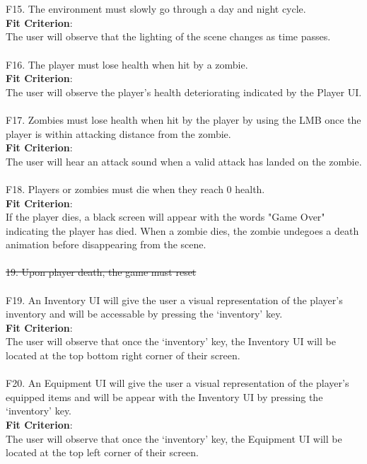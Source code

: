 \documentclass[12pt, titlepage]{article}
\begin{document}
\\\\
{\color{magenta} F15.} The environment must slowly go through a day and night cycle. \\
{\color{magenta} \textbf{Fit Criterion}:\\ The user will observe that the lighting of the scene changes as time passes. }
\\\\
{\color{magenta} F16.} The player must lose health when hit by a zombie. \\
{\color{magenta} \textbf{Fit Criterion}:\\ The user will observe the player's health deteriorating indicated by the Player UI.} 
\\\\
{\color{magenta} F17.} Zombies must lose health when hit by the player {\color{magenta} by using the LMB once the player is within attacking distance from the zombie. \\
\textbf{Fit Criterion}:\\ The user will hear an attack sound when a valid attack has landed on the zombie}. 
\\\\
{\color{magenta} F18.} Players or zombies must die when they reach 0 health. \\
{\color{magenta} \textbf{Fit Criterion}:\\ If the player dies, a black screen will appear with the words "Game Over" indicating the player has died. When a zombie dies, the zombie undegoes a death animation before disappearing from the scene}. 
\\\\
\sout{19. Upon player death, the game must reset}
\\\\
{\color{magenta} F19. An Inventory UI will give the user a visual representation of the player's inventory and will be accessable by pressing the ‘inventory’ key.\\
\textbf{Fit Criterion}:\\ The user will observe that once the ‘inventory’ key, the Inventory UI will be located at the top bottom right corner of their screen.} 
\\\\
{\color{magenta} F20. An Equipment UI will give the user a visual representation of the player's equipped items and will be appear with the Inventory UI by pressing the ‘inventory’ key. \\
\textbf{Fit Criterion}:\\ The user will observe that once the ‘inventory’ key, the Equipment UI will be located at the top left corner of their screen.} 
\end{document}
